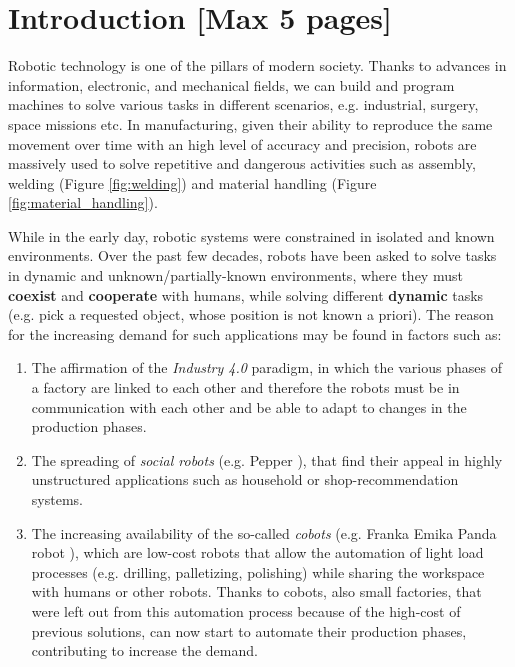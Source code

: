 \section{Introduction [Max 5 pages]}
\label{sec:intro}
Robotic technology is one of the pillars of modern society. Thanks to advances in information, electronic, and mechanical fields, we can build and program machines to solve various tasks in different scenarios, e.g. industrial, surgery, space missions etc.
\newline In manufacturing, given their ability to reproduce the same movement over time with an high level of accuracy and precision, robots are massively used to solve repetitive and dangerous activities such as assembly, welding (Figure \ref{fig:welding}) and material handling    (Figure \ref{fig:material_handling}).

\noindent While in the early day, robotic systems were constrained in isolated and known environments. Over the past few decades, robots have been asked to solve tasks in dynamic and unknown/partially-known environments, where they must \textbf{coexist} and \textbf{cooperate} with humans, while  solving different \textbf{dynamic} tasks (e.g. pick a requested object, whose position is not known a priori). 
\newline The reason for the increasing demand for such applications may be found in factors such as:
\begin{enumerate}[label=(\alph*)]
    \item The affirmation of the \textit{Industry 4.0} paradigm, in which the various phases of a factory are linked to each other and therefore the robots must be in communication with each other and be able to adapt to changes in the production phases.
    \item The spreading of \textit{social robots} (e.g. Pepper \cite{pepper}), that find their appeal in highly unstructured applications such as household or shop-recommendation systems.      
    \item The increasing availability of the so-called \textit{cobots} (e.g. Franka Emika Panda robot \cite{panda}), which are low-cost robots that allow the automation of light load processes (e.g. drilling, palletizing, polishing) while sharing the workspace with humans or other robots. Thanks to cobots, also small factories, that were left out from this automation process because of the high-cost of previous solutions, can now start to automate their production phases, contributing to increase the demand.
\end{enumerate}
